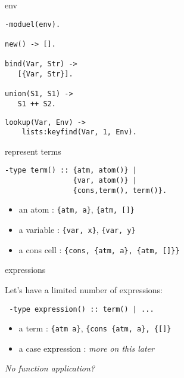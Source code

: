 \begin{frame}[fragile]{env}

\begin{verbatim}
-moduel(env).

new() -> [].

bind(Var, Str) ->
   [{Var, Str}].

union(S1, S1) ->
   S1 ++ S2.

\end{verbatim}
\pause
\begin{verbatim}
lookup(Var, Env) ->
    lists:keyfind(Var, 1, Env).
\end{verbatim}

\end{frame}

\begin{frame}[fragile]{represent terms}

\begin{verbatim} 
-type term() :: {atm, atom()} | 
                {var, atom()} | 
                {cons,term(), term()}.
\end{verbatim} 

\pause\vspace{20pt}

\begin{itemize}
\item an atom : {\tt \{atm, a\}}, {\tt  \{atm, []\}}
\item a variable : {\tt \{var, x\}}, {\tt \{var, y\}}
\item a cons cell : {\tt \{cons, \{atm, a\}, \{atm, []\}\}}
\end{itemize} 

\end{frame}

\begin{frame}[fragile]{expressions} 

Let's have a limited number of expressions:

\pause\vspace{20pt}
\verb+ -type expression() :: term() | ... +
\pause\vspace{20pt}

\begin{itemize}
\item a term : {\tt \{atm a\}}, {\tt \{cons \{atm, a\}, \{[]\}}
\item a case expression : {\em more on this later}
\end{itemize}

\pause\vspace{20pt}
{\em No function application? }

\end{frame}

